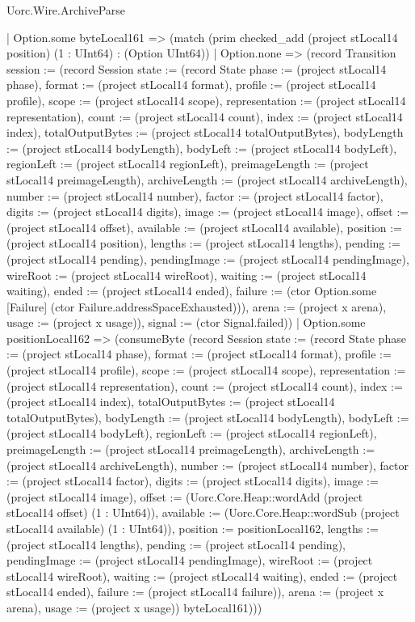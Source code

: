 \begin{lexlean}{Uorc.Wire.ArchiveParse}
\begin{semanticmodule}
{              | Option.some byteLocal161 => (match (prim checked_add (project stLocal14 position) (1 : UInt64) : (Option UInt64))
                | Option.none => (record Transition {session := (record Session {state := (record State {phase := (project stLocal14 phase), format := (project stLocal14 format), profile := (project stLocal14 profile), scope := (project stLocal14 scope), representation := (project stLocal14 representation), count := (project stLocal14 count), index := (project stLocal14 index), totalOutputBytes := (project stLocal14 totalOutputBytes), bodyLength := (project stLocal14 bodyLength), bodyLeft := (project stLocal14 bodyLeft), regionLeft := (project stLocal14 regionLeft), preimageLength := (project stLocal14 preimageLength), archiveLength := (project stLocal14 archiveLength), number := (project stLocal14 number), factor := (project stLocal14 factor), digits := (project stLocal14 digits), image := (project stLocal14 image), offset := (project stLocal14 offset), available := (project stLocal14 available), position := (project stLocal14 position), lengths := (project stLocal14 lengths), pending := (project stLocal14 pending), pendingImage := (project stLocal14 pendingImage), wireRoot := (project stLocal14 wireRoot), waiting := (project stLocal14 waiting), ended := (project stLocal14 ended), failure := (ctor Option.some [Failure] (ctor Failure.addressSpaceExhausted))}), arena := (project x arena), usage := (project x usage)}), signal := (ctor Signal.failed)})
                | Option.some positionLocal162 => (consumeByte (record Session {state := (record State {phase := (project stLocal14 phase), format := (project stLocal14 format), profile := (project stLocal14 profile), scope := (project stLocal14 scope), representation := (project stLocal14 representation), count := (project stLocal14 count), index := (project stLocal14 index), totalOutputBytes := (project stLocal14 totalOutputBytes), bodyLength := (project stLocal14 bodyLength), bodyLeft := (project stLocal14 bodyLeft), regionLeft := (project stLocal14 regionLeft), preimageLength := (project stLocal14 preimageLength), archiveLength := (project stLocal14 archiveLength), number := (project stLocal14 number), factor := (project stLocal14 factor), digits := (project stLocal14 digits), image := (project stLocal14 image), offset := (Uorc.Core.Heap::wordAdd (project stLocal14 offset) (1 : UInt64)), available := (Uorc.Core.Heap::wordSub (project stLocal14 available) (1 : UInt64)), position := positionLocal162, lengths := (project stLocal14 lengths), pending := (project stLocal14 pending), pendingImage := (project stLocal14 pendingImage), wireRoot := (project stLocal14 wireRoot), waiting := (project stLocal14 waiting), ended := (project stLocal14 ended), failure := (project stLocal14 failure)}), arena := (project x arena), usage := (project x usage)}) byteLocal161)))
}
\end{semanticmodule}
\end{lexlean}
